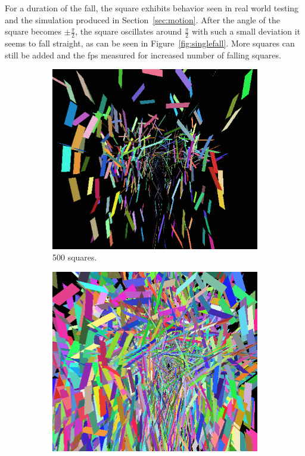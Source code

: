 \noindent For a duration of the fall, the square exhibits behavior seen in real world testing and the simulation produced in Section~\ref{sec:motion}. After the angle of the square becomes $\pm\frac{\pi}{2}$, the square oscillates around $\frac{\pi}{2}$ with such a small deviation it seems to fall straight, as can be seen in Figure~\ref{fig:singlefall}. More squares can still be added and the fps measured for increased number of falling squares.

\begin{figure}[H]
\centering
	\begin{subfigure}[b]{0.3\textwidth}
		\includegraphics[width=\textwidth]{Motion_Graphs/500_leaves.png}
    	\caption{\label{fig:500leaves}500 squares.}
    \end{subfigure}
    \begin{subfigure}[b]{0.3\textwidth}
		\includegraphics[width=\textwidth]{Motion_Graphs/13000_leaves.png}

\end{subfigure}
\end{figure}
